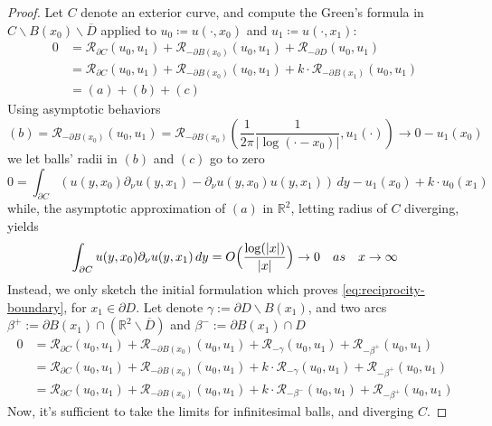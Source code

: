\documentclass[10pt, a4paper, twoside, openright]{book}
\theoremstyle{definition}
\theoremstyle{plain}
\theoremstyle{plain}
\theoremstyle{plain}
\theoremstyle{plain}
\theoremstyle{plain}
\theoremstyle{plain}
\theoremstyle{plain}
\theoremstyle{plain}
\begin{document}
\begin{proof}
 Let $C$ denote an exterior curve, and compute the Green's formula in $C \backslash B(x_0) \backslash \overline{D}$ applied to $u_0\coloneqq u(\cdot,x_0)$ and $u_1\coloneqq u(\cdot,x_1)$:
 \begin{align*}
 0 &= \mathcal{R}_{\partial C}(u_0,u_1)+\mathcal{R}_{-\partial B(x_0)}(u_0,u_1)+\mathcal{R}_{-\partial D}(u_0,u_1) \\
   &= \mathcal{R}_{\partial C}(u_0,u_1)+\mathcal{R}_{-\partial B(x_0)}(u_0,u_1) + k \cdot \mathcal{R}_{-\partial B(x_1)}(u_0,u_1)\\
   &= (a) + (b) + (c)
 \end{align*}
 Using asymptotic behaviors
 \begin{equation*}
  (b) = \mathcal{R}_{-\partial B(x_0)}(u_0,u_1) = \mathcal{R}_{-\partial B(x_0)}(\frac{1}{2\pi}\frac{1}{| \log(\cdot - x_0) |},u_1(\cdot))\to 0 - u_1(x_0)
 \end{equation*}
 we let balls' radii in $(b)$ and $(c)$ go to zero
 \begin{equation*}
 0 = \int_{\partial C}(u(y,x_0)\partial_\nu u(y,x_1) - \partial_\nu u(y,x_0)u(y,x_1))\, dy - u_1(x_0) + k \cdot u_0(x_1)
 \end{equation*}
 while, the asymptotic approximation of $(a)$ in $\mathbb{R}^2$, letting radius of $C$ diverging, yields
 \begin{equation*}
  \int_{\partial C} u(y,x_0)\partial_\nu u(y,x_1) \, dy = O\Bigl(\frac{\log(|x|)}{|x|}\Bigr)\to 0\quad as \quad x\to \infty
 \end{equation*}
 Instead, we only sketch the initial formulation  which proves \eqref{eq:reciprocity-boundary}, for $x_1\in\partial D$. Let denote  
 $\gamma := \partial D\backslash B(x_1)$, and two arcs $\beta^+ := \partial B(x_1) \cap (\mathbb{R}^2\backslash\overline{D})$ and $\beta^- := \partial B(x_1) \cap D$
 \begin{align*}
 0 &= \mathcal{R}_{\partial C}(u_0,u_1)+\mathcal{R}_{-\partial B(x_0)}(u_0,u_1)+\mathcal{R}_{- \gamma}(u_0,u_1)+\mathcal{R}_{- \beta^+}(u_0,u_1)\\
 &= \mathcal{R}_{\partial C}(u_0,u_1)+\mathcal{R}_{-\partial B(x_0)}(u_0,u_1)+k\cdot \mathcal{R}_{- \gamma}(u_0,u_1)+\mathcal{R}_{- \beta^+}(u_0,u_1)\\
 &= \mathcal{R}_{\partial C}(u_0,u_1)+\mathcal{R}_{-\partial B(x_0)}(u_0,u_1)+k\cdot \mathcal{R}_{- \beta^-}(u_0,u_1)+\mathcal{R}_{- \beta^+}(u_0,u_1)
 \end{align*}
 Now, it's sufficient to take the limits for infinitesimal balls, and diverging $C$.
\end{proof}
\end{document}
